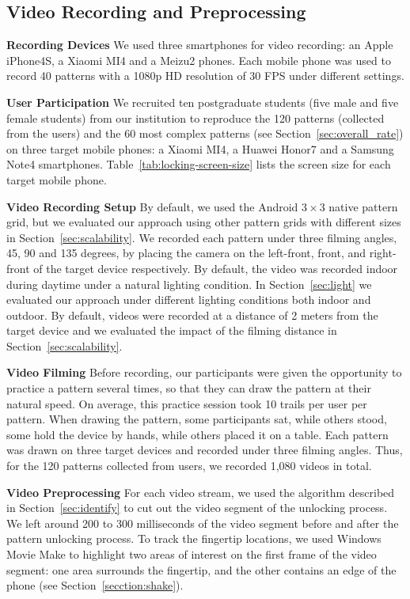     \subsection{Video Recording and Preprocessing}
    \noindent\textbf{Recording Devices} We used three smartphones for video recording: an Apple iPhone4S,
     a Xiaomi MI4 and a Meizu2 phones. Each mobile phone was used to record 40 patterns with a
    1080p HD resolution of 30 FPS under different settings.

    \noindent\textbf{User Participation} We recruited ten postgraduate students (five male and five female
    students) from our institution to reproduce the 120 patterns (collected from the users)
    and the 60 most complex patterns (see Section~\ref{sec:overall_rate})  on three target mobile phones:
    a Xiaomi MI4, a Huawei Honor7 and a Samsung Note4 smartphones. Table~\ref{tab:locking-screen-size} lists
    the screen size for each target mobile phone.


   \noindent\textbf{Video Recording Setup}
    By default, we used the  Android $3 \times 3$ native pattern grid,
    but we evaluated our approach using other pattern grids with different sizes in
    Section~\ref{sec:scalability}. We recorded each pattern under three filming
    angles, 45, 90 and 135 degrees, by placing the camera on the left-front, front, and right-front
    of the target device respectively.
    By default, the video
    was recorded indoor during daytime under a natural lighting condition. In
    Section~\ref{sec:light} we evaluated our approach under different lighting conditions
    both indoor and outdoor. By default, videos were recorded at a distance of
    2 meters from the target device and we evaluated the impact of the filming distance in
    Section~\ref{sec:scalability}.

    \noindent \textbf{Video Filming}
     Before recording, our participants were given the opportunity to practice a pattern
    several times, so that they can draw the pattern at
    their natural speed. On average, this practice session took 10 trails per user per pattern.
    When drawing the
    pattern, some participants sat, while others stood, some hold the device
    by hands, while others placed it on a table.
    Each pattern was drawn on three target devices and
    recorded under three filming angles. Thus, for the 120 patterns collected from users, we recorded 1,080 videos in total.

    \noindent\textbf{Video Preprocessing}
    For each video stream, we used the algorithm described in Section~\ref{sec:identify} to cut out the video segment
    of the unlocking process. We left around 200 to 300 milliseconds of the video segment before and after the pattern unlocking process.
    To track the fingertip locations,
    we used Windows Movie Make to highlight two areas of interest on the first frame of
    the video segment: one area surrounds the fingertip, and the other contains an edge of the
    phone (see Section~\ref {secction:shake}).


